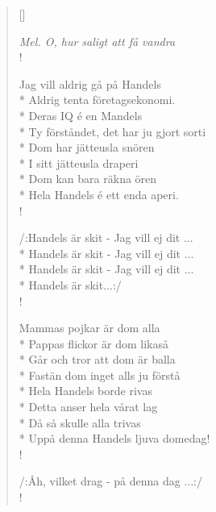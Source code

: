 \settowidth{\versewidth}{Pappas flickor är dom likaså.}


\begin{verse}[\versewidth]

\flagverse{}
\emph{Mel. O, hur saligt att få vandra}\\!

Jag vill aldrig gå på Handels\\*
Aldrig tenta företagsekonomi.\\*
Deras IQ é en Mandels\\*
Ty förståndet, det har ju gjort sorti\\*
Dom har jätteusla snören\\*
I sitt jätteusla draperi\\*
Dom kan bara räkna ören\\*
Hela Handels é ett enda aperi.\\!


/:Handels är skit - Jag vill ej dit ...\\*
Handels är skit - Jag vill ej dit ...\\*
Handels är skit - Jag vill ej dit ...\\*
Handels är skit...:/\\!


Mammas pojkar är dom alla\\*
Pappas flickor är dom likaså\\*
Går och tror att dom är balla\\*
Fastän dom inget alls ju förstå\\*
Hela Handels borde rivas\\*
Detta anser hela vårat lag\\*
Då så skulle alla trivas\\*
Uppå denna Handels ljuva domedag!\\!


/:Åh, vilket drag - på denna dag ...:/\\!




\end{verse}

